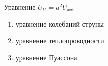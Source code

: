 Уравнение \(U_{tt}=a^2U_{xx}\)

\begin{enumerate}[label=\arabic*)]
    \item уравнение колебаний струны
    \item уравнение теплопроводности
    \item уравнение Пуассона
\end{enumerate}

